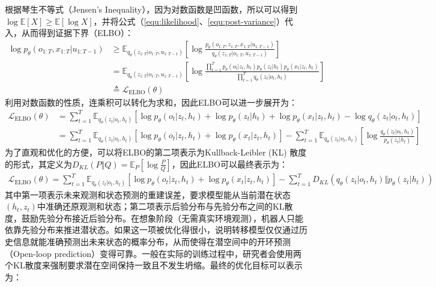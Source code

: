 根据琴生不等式（Jensen's Inequality），因为对数函数是凹函数，所以可以得到$\log \mathbb{E}[X] \geq \mathbb{E}[\log X]$，并将公式（\ref{equ:likelihood}、\ref{equ:post-variance}）代入，从而得到证据下界（ELBO）：
\begin{equation}
\begin{aligned}
    \log p_{\theta}(o_{1:T}, x_{1:T}\vert u_{1:T-1}) &\geq \mathbb{E}_{q_{\theta}(z_{1:T}\vert o_{1:T}, u_{1:T-1})} \left[ \log \frac{p_{\theta}(o_{1:T}, z_{1:T}, x_{1:T}\vert u_{1:T-1})}{q_{\theta}(z_{1:T}\vert o_{1:T}, u_{1:T-1})} \right] \\
    & = \mathbb{E}_{q_{\theta}(z_{1:T}\vert o_{1:T}, u_{1:T-1})} \left[ \log \frac{\prod_{t=1}^T p_{\theta}(o_t\vert z_t, h_t) p_{\theta}(z_t\vert h_t) p_{\theta}(x_t\vert z_t, h_t)}{\prod_{t=1}^T q_{\theta}(z_t\vert o_t, h_t)} \right] \\
    & \triangleq \mathcal{L}_{\text{ELBO}}(\theta)
\end{aligned}
\end{equation}
利用对数函数的性质，连乘积可以转化为求和，因此ELBO可以进一步展开为：
\begin{equation}
\begin{aligned}
    \mathcal{L}_{\text{ELBO}}(\theta) &= \sum_{t=1}^T \mathbb{E}_{q_{\theta}(z_t\vert o_t, h_t)} \left[ \log p_{\theta}(o_t\vert z_t, h_t) + \log p_{\theta}(z_t\vert h_t) + \log p_{\theta}(x_t\vert z_t, h_t) - \log q_{\theta}(z_t\vert o_t, h_t) \right] \\
    &= \sum_{t=1}^T \mathbb{E}_{q_{\theta}(z_t\vert o_t, h_t)} \left[ \log p_{\theta}(o_t\vert z_t, h_t) + \log p_{\theta}(x_t\vert z_t, h_t) \right] - \sum_{t=1}^T \mathbb{E}_{q_{\theta}(z_t\vert o_t, h_t)} \left[ \log \frac{q_{\theta}(z_t\vert o_t, h_t)}{p_{\theta}(z_t\vert h_t)} \right]
\end{aligned}
\end{equation}
为了直观和优化的方便，可以将ELBO的第二项表示为Kullback-Leibler (KL) 散度的形式，其定义为$D_{KL}(P\Vert Q) = \mathbb{E}_{P}[\log \frac{P}{Q}]$，因此ELBO可以最终表示为：
\begin{equation}
\begin{aligned}
    \mathcal{L}_{\text{ELBO}}(\theta) = \sum_{t=1}^T \mathbb{E}_{q_{\theta}(z_t\vert o_t, h_t)} \left[ \log p_{\theta}(o_t\vert z_t, h_t) + \log p_{\theta}(x_t\vert z_t, h_t) \right] - \sum_{t=1}^T D_{KL} \left(q_{\theta}(z_t\vert o_t, h_t) \Vert p_{\theta}(z_t\vert h_t)\right)
\end{aligned}
\end{equation}
其中第一项表示未来观测和状态预测的重建误差，要求模型能从当前潜在状态$(h_t, z_t)$中准确还原观测和状态；第二项表示后验分布与先验分布之间的KL散度，鼓励先验分布接近后验分布。在想象阶段（无需真实环境观测），机器人只能依靠先验分布来推进潜状态。如果这一项被优化得很小，说明转移模型仅仅通过历史信息就能准确预测出未来状态的概率分布，从而使得在潜空间中的开环预测（Open-loop prediction）变得可靠。一般在实际的训练过程中，研究者会使用两个KL散度来强制要求潜在空间保持一致且不发生坍缩\cite{chen2021exploring}。最终的优化目标可以表示为：
